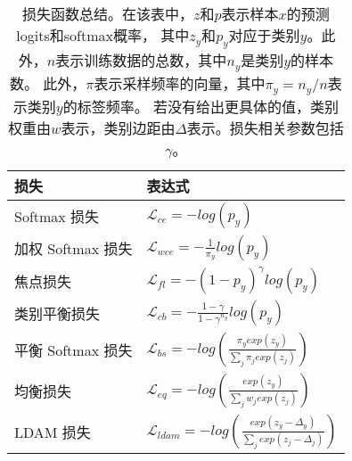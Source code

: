 \begin{table}[htbp]
\small
\centering
\captionsetup{font=footnotesize}
\caption{损失函数总结。在该表中，$z$和$p$表示样本$x$的预测logits和softmax概率，
其中$z_y$和$p_y$对应于类别$y$。此外，$n$表示训练数据的总数，其中$n_y$是类别$y$的样本数。
此外，$\pi$表示采样频率的向量，其中$\pi_y=n_y/n$表示类别$y$的标签频率。
若没有给出更具体的值，类别权重由$w$表示，类别边距由$\Delta$表示。损失相关参数包括$\gamma$。}
\begin{tabular}{ll}
\toprule
损失 & 表达式 \\
\midrule
Softmax 损失 & $\mathcal{L}_{ce}=-log(p_y)$ \\
加权 Softmax 损失 & $\mathcal{L}_{wce}=-\frac{1}{\pi_y}log(p_y)$ \\
焦点损失 \cite{Lin_2017_focal} & $\mathcal{L}_{fl}=-(1-p_y)^\gamma log(p_y)$ \\
类别平衡损失 \cite{Cui_2019} & $\mathcal{L}_{cb}=-\frac{1-\gamma}{1-\gamma^{n_y}}log(p_y)$ \\
平衡 Softmax 损失 \cite{ren2020balanced} & $\mathcal{L}_{bs}=-log(\frac{\pi_y exp(z_y)}{\sum_j \pi_j exp(z_j)})$ \\
均衡损失 \cite{Tan_2020} & $\mathcal{L}_{eq}=-log(\frac{exp(z_y)}{\sum_j w_j exp(z_j)})$ \\
LDAM 损失 \cite{cao2019learning} & $\mathcal{L}_{ldam}=-log(\frac{exp(z_y-\Delta_y)}{\sum_j exp(z_j-\Delta_j)})$ \\
\bottomrule
\end{tabular}%
\label{tab:3}%
\end{table}%